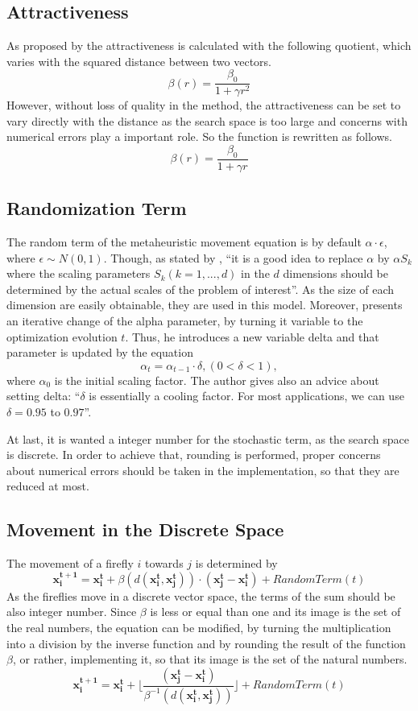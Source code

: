 \documentclass[tuberlin,cic,tc,openright,english,noabntcite,oneside]{iiufrgs}
\begin{document}
\subsection{Attractiveness}
As proposed by \textcite[p. 173]{yang_firefly_2009} the attractiveness is calculated with the following quotient, which varies with the squared distance between two vectors.
$$\beta(r) = \frac{\beta_{0}}{1 + \gamma r^2}$$
However, without loss of quality in the method, the attractiveness can be set to vary directly with the distance as the search space is too large and concerns with numerical errors play a important role. So the function is rewritten as follows.
$$\beta(r) = \frac{\beta_{0}}{1 + \gamma r}$$

\subsection{Randomization Term}
The random term of the metaheuristic movement equation is by default $\alpha \cdot \epsilon$, where $\epsilon \sim N(0,1)$. Though, as stated by \textcite[p. 80]{yang_firefly_2010}, \enquote{it is a good idea to replace $\alpha$ by $\alpha S_k$ where the scaling parameters $S_k (k=1,...,d)$ in the $d$ dimensions should be determined by the actual scales of the problem of interest}. As the size of each dimension are easily obtainable, they are used in this model. Moreover, \textcite[p. 37-38]{yang_firefly_2013} presents an iterative change of the alpha parameter, by turning it variable to the optimization evolution $t$. Thus, he introduces a new variable delta and that parameter is updated by the equation
$$ \alpha_t = \alpha_{t-1} \cdot \delta, (0 < \delta < 1),$$ where $\alpha_0$ is the initial scaling factor. The author gives also an advice about setting delta: \enquote{$\delta$ is essentially a cooling factor. For most applications, we can use $\delta = 0.95$ to $0.97$}.

At last, it is wanted a integer number for the stochastic term, as the search space is discrete. In order to achieve that, rounding is performed, proper concerns about numerical errors should be taken in the implementation, so that they are reduced at most.

\subsection{Movement in the Discrete Space}
The movement of a firefly $i$ towards $j$ is determined by $$\mathbf{x^{t+1}_i} = \mathbf{x^{t}_i} + \beta(d(\mathbf{x^{t}_i}, \mathbf{x^{t}_j})) \cdot (\mathbf{x^{t}_j} - \mathbf{x^{t}_i}) + RandomTerm(t)$$
As the fireflies move in a discrete vector space, the terms of the sum should be also integer number. Since $\beta$ is less or equal than one and its image is the set of the real numbers, the equation can be modified, by turning the multiplication into a division by the inverse function and by rounding the result of the function $\beta$, or rather, implementing it, so that its image is the set of the natural numbers.
$$\mathbf{x^{t+1}_i} = \mathbf{x^{t}_i} +  \lfloor \frac{(\mathbf{x^{t}_j} - \mathbf{x^{t}_i})}{\beta^{-1}(d(\mathbf{x^{t}_i}, \mathbf{x^{t}_j}))} \rfloor + RandomTerm(t)$$
\end{document}
